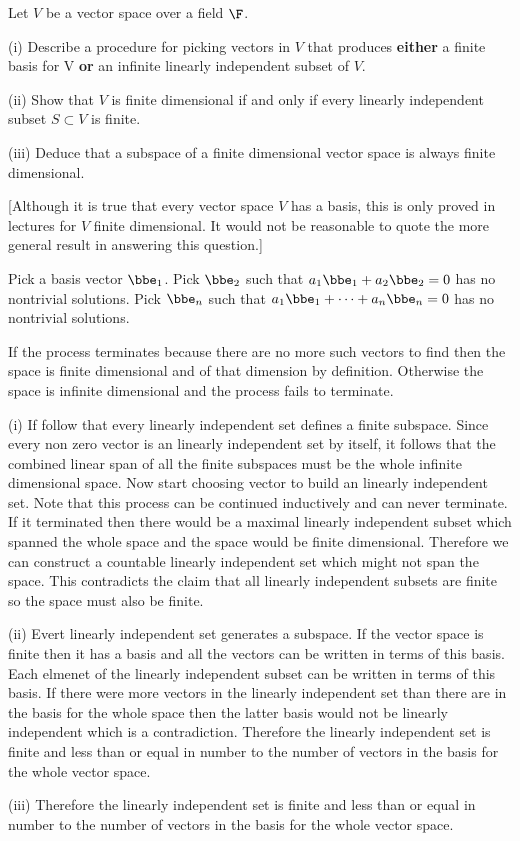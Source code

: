 \begin{problem}
Let $V$ be a vector space over a field $\F$.
\ben
\item [(i)] Describe a procedure for picking vectors in $V$ that produces {\bf either} a finite basis for V {\bf or} an infinite linearly independent subset of $V$.
\item [(ii)] Show that $V$ is finite dimensional if and only if every linearly independent subset $S \subset V$ is finite.
\item [(iii)] Deduce that a subspace of a finite dimensional vector space is always finite dimensional.

[Although it is true that every vector space $V$ has a basis, this is only proved in lectures for $V$ finite dimensional. It would not be reasonable to quote the more general result in answering this question.]
\een
\end{problem}

\begin{solution}[\bf Solution.]
Pick a basis vector $\bbe_1$. Pick $\bbe_2$ such that $a_1 \bbe_1 + a_2\bbe_2 = 0$ has no nontrivial solutions. Pick $\bbe_n$ such that $a_1\bbe_1 + \dots + a_n \bbe_n = 0$ has no nontrivial solutions.

If the process terminates because there are no more such vectors to find then the space is finite dimensional and of that dimension by definition. Otherwise the space is infinite dimensional and the process fails to terminate.
\ben
\item [(i)] If follow that every linearly independent set defines a finite subspace. Since every non zero vector is an linearly independent set by itself, it follows that the combined linear span of all the finite subspaces must be the whole infinite dimensional space. Now start choosing vector to build an linearly independent set. Note that this process can be continued inductively and can never terminate. If it terminated then there would be a maximal linearly independent subset which spanned the whole space and the space would be finite dimensional. Therefore we can construct a countable linearly independent set which might not span the space. This contradicts the claim that all linearly independent subsets are finite so the space must also be finite.
\item [(ii)] Evert linearly independent set generates a subspace. If the vector space is finite then it has a basis and all the vectors can be written in terms of this basis. Each elmenet of the linearly independent subset can be written in terms of this basis. If there were more vectors in the linearly independent set than there are in the basis for the whole space then the latter basis would not be linearly independent which is a contradiction. Therefore the linearly independent set is finite and less than or equal in number to the number of vectors in the basis for the whole vector space.
\item [(iii)] Therefore the linearly independent set is finite and less than or equal in number to the number of vectors in the basis for the whole vector space.
\een
\end{solution}


